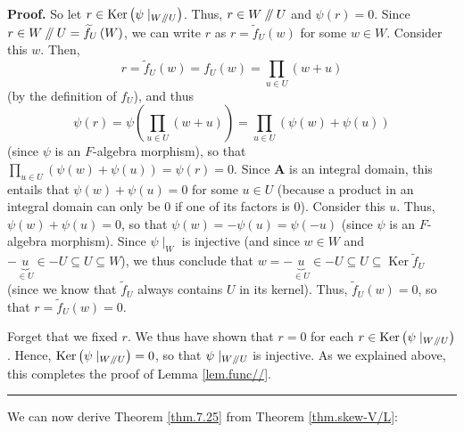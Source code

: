 \documentclass[numbers=enddot,12pt,final,onecolumn,notitlepage]{scrartcl}%
\numberwithin{exer}{section}
\theoremstyle{definition}
\newenvironment{proof}[1][Proof]{\noindent\textbf{#1.} }{\ \rule{0.5em}{0.5em}}
\let\prodnonlimits\prod
\renewcommand{\prod}{\prodnonlimits\limits}
\newcommand{\sslash}{\mathbin{/\mkern-5mu/}}
\theoremstyle{plainsl}
\begin{document}
\begin{proof}
So let $r\in\operatorname*{Ker}\left(  \psi\mid_{W\sslash U}\right)  $. Thus,
$r\in W\sslash U$ and $\psi\left(  r\right)  =0$. Since $r\in
W\sslash U=\widetilde{f}_{U}\left(  W\right)  $, we can write $r$ as
$r=\widetilde{f}_{U}\left(  w\right)  $ for some $w\in W$. Consider this $w$.
Then,
\[
r=\widetilde{f}_{U}\left(  w\right)  =f_{U}\left(  w\right)  =\prod_{u\in
U}\left(  w+u\right)
\]
(by the definition of $f_{U}$), and thus%
\[
\psi\left(  r\right)  =\psi\left(  \prod_{u\in U}\left(  w+u\right)  \right)
=\prod_{u\in U}\left(  \psi\left(  w\right)  +\psi\left(  u\right)  \right)
\]
(since $\psi$ is an $F$-algebra morphism), so that $\prod_{u\in U}\left(
\psi\left(  w\right)  +\psi\left(  u\right)  \right)  =\psi\left(  r\right)
=0$. Since $\mathbf{A}$ is an integral domain, this entails that $\psi\left(
w\right)  +\psi\left(  u\right)  =0$ for some $u\in U$ (because a product in
an integral domain can only be $0$ if one of its factors is $0$). Consider
this $u$. Thus, $\psi\left(  w\right)  +\psi\left(  u\right)  =0$, so that
$\psi\left(  w\right)  =-\psi\left(  u\right)  =\psi\left(  -u\right)  $
(since $\psi$ is an $F$-algebra morphism). Since $\psi\mid_{W}$ is injective
(and since $w\in W$ and $-\underbrace{u}_{\in U}\in-U\subseteq U\subseteq W$),
we thus conclude that $w=-\underbrace{u}_{\in U}\in-U\subseteq U\subseteq
\operatorname*{Ker}\widetilde{f}_{U}$ (since we know that $\widetilde{f}_{U}$
always contains $U$ in its kernel). Thus, $\widetilde{f}_{U}\left(  w\right)
=0$, so that $r=\widetilde{f}_{U}\left(  w\right)  =0$.

Forget that we fixed $r$. We thus have shown that $r=0$ for each
$r\in\operatorname*{Ker}\left(  \psi\mid_{W\sslash U}\right)  $. Hence,
$\operatorname*{Ker}\left(  \psi\mid_{W\sslash U}\right)  =0$, so that
$\psi\mid_{W\sslash U}$ is injective. As we explained above, this completes
the proof of Lemma \ref{lem.func//}.
\end{proof}

We can now derive Theorem \ref{thm.7.25} from Theorem \ref{thm.skew-V/L}:
\end{document}
